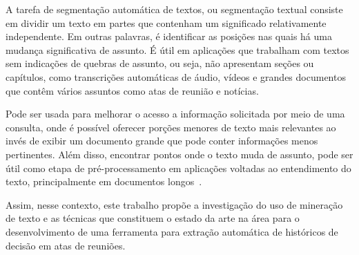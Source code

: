 

A tarefa de segmentação automática de textos, ou segmentação textual consiste em dividir um texto em partes que contenham um significado relativamente independente. Em outras palavras, é identificar as posições nas quais há uma mudança significativa de assunto. É útil em aplicações que trabalham com textos sem indicações de quebras de assunto, ou seja, não apresentam seções ou capítulos, como transcrições automáticas de áudio, vídeos e grandes documentos que contêm vários assuntos como atas de reunião e notícias. %

Pode ser usada para melhorar o acesso a informação solicitada por meio de uma consulta, onde é possível oferecer porções menores de texto mais relevantes ao invés de exibir um documento grande que pode conter informações menos pertinentes.  Além disso, encontrar pontos onde o texto muda de assunto, pode ser útil como etapa de pré-processamento em aplicações voltadas ao entendimento do texto, principalmente em documentos longos~\cite{Choi2000}.





Assim, nesse contexto, este trabalho propõe a investigação do uso de mineração de texto e as técnicas que constituem o estado da arte na área para o desenvolvimento de uma ferramenta para extração automática de históricos de decisão em atas de reuniões.  %



